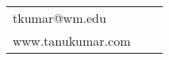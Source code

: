 \documentclass[letterpaper, 11pt]{article}
\begin{document}


\vspace{0.3cm} 
\begin{center}
\begin{tabular}{lll}
 tkumar@wm.edu      &
\hspace{3.7in}     &
\hspace{3.7in} 	 \\


www.tanukumar.com  & 
\hspace{3.7in}  & 
\hspace{3.7in} \end{tabular}
\end{center}


\setlength{\tabcolsep}{8pt}
\end{document}
